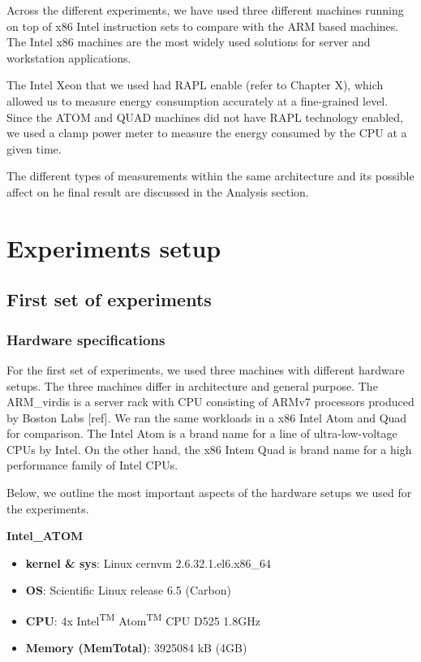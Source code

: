 Across the different experiments, we have used three different machines running
on top of x86 Intel instruction sets to
compare with the ARM based machines. The Intel x86 machines are the most widely
used solutions for server and workstation applications.

The Intel Xeon that we used had RAPL enable (refer to Chapter X), which allowed us to measure energy
consumption accurately at a fine-grained level. Since the ATOM and QUAD machines
did not have RAPL technology enabled, we used a clamp power meter to measure the
energy consumed by the CPU at a given time.

The different types of measurements within the same architecture and
its possible affect on he final result are discussed in the Analysis section.

\clearpage


\section{Experiments setup}
\subsection{First set of experiments}

\subsubsection*{Hardware specifications}
For the first set of experiments, we used three machines with different hardware setups. The three machines differ in architecture and general purpose. The ARM\_virdis is a server rack with CPU consisting of ARMv7 processors produced by Boston Labs [ref]. We ran the same workloads in a x86 Intel Atom and Quad for comparison. The Intel Atom is a brand name for a line of ultra-low-voltage CPUs by Intel. On the other hand, the x86 Intem Quad is brand name for a high performance family of Intel CPUs.

Below, we outline the most important aspects of the hardware setups we used for the experiments.

\vspace{10mm}
\textbf{Intel\_ATOM}
\begin{itemize}
  \item[] \textbf{kernel \& sys}:  Linux cern\-vm 2.6.32.1.el6.x86\_64
  \item[] \textbf{OS}: Scientific Linux release 6.5 (Carbon)
  \item[] \textbf{CPU}:   4x Intel\textsuperscript{TM} Atom\textsuperscript{TM} CPU D525 \@ 1.8GHz
  \item[] \textbf{Memory  (MemTotal)}:        3925084  kB (4GB)
\end{itemize}

